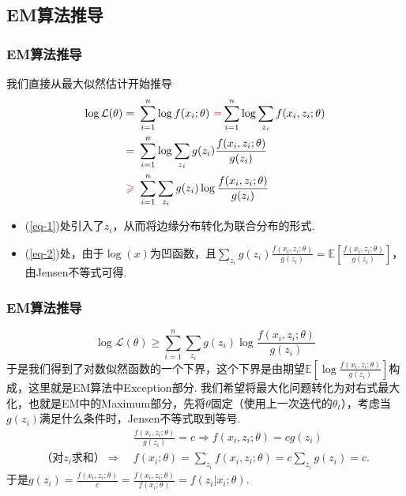 \documentclass[UTF8]{ctexbeamer}
\let\geq=\geqslant %
\numberwithin{equation}{section}  %
\def\E{\mathbb{E}}          %
\def\L{\mathcal{L}}         %
\def\red{\color{red}}       %
\begin{document}
\subsection{EM算法推导}
\begin{frame}
    \frametitle{EM算法推导}
    我们直接从最大似然估计开始推导
    \begin{align}
        \label{eq-1}\log \L(\theta) =&\ \sum_{i=1}^n\log f(x_i;\theta)\ {\red=} \sum_{i=1}^n\log\sum_{z_i}f(x_i,z_i;\theta)\\
        \nonumber =&\ \sum_{i=1}^n\log\sum_{z_i}g(z_i)\frac{f(x_i,z_i;\theta)}{g(z_i)}\\
        \label{eq-2}{\red\geq}&\ \sum_{i=1}^n\sum_{z_i}g(z_i)\log\frac{f(x_i,z_i;\theta)}{g(z_i)}
    \end{align}
    \pause
    \begin{itemize}[<+->]
        \item (\ref{eq-1})处引入了$z_i$，从而将边缘分布转化为联合分布的形式.
        \item (\ref{eq-2})处，由于$\log(x)$为凹函数，且$\sum_{z_i}g(z_i)\frac{f(x_i,z_i;\theta)}{g(z_i)}=\E\left[\frac{f(x_i,z_i;\theta)}{g(z_i)}\right]$，由Jensen不等式可得.
    \end{itemize}
\end{frame}

\begin{frame}
    \frametitle{EM算法推导}

    \begin{equation*}
        \log \L(\theta) \geq \sum_{i=1}^n\sum_{z_i}g(z_i)\log\frac{f(x_i,z_i;\theta)}{g(z_i)}
    \end{equation*}
    于是我们得到了对数似然函数的一个下界，这个下界是由期望$\E\left[\log\frac{f(x_i,z_i;\theta)}{g(z_i)}\right]$构成，这里就是EM算法中Exception部分. 我们希望将最大化问题转化为对右式最大化，也就是EM中的Maximum部分，先将$\theta$固定（使用上一次迭代的$\theta_{t}$），考虑当$g(z_i)$满足什么条件时，Jensen不等式取到等号.\pause
    \begin{align*}
        &\ \frac{f(x_i,z_i;\theta)}{g(z_i)} = c\Rightarrow f(x_i,z_i;\theta) = cg(z_i)\\
        \text{（对}z_i\text{求和）}\Rightarrow&\ f(x_i;\theta) =\sum_{z_i}f(x_i,z_i;\theta) = c\sum_{z_i}g(z_i) = c.
    \end{align*}
    于是$g(z_i) = \frac{f(x_i,z_i;\theta)}{c} = \frac{f(x_i,z_i;\theta)}{f(x_i;\theta)}=f(z_i|x_i;\theta)$.

\end{frame}
\end{document}

